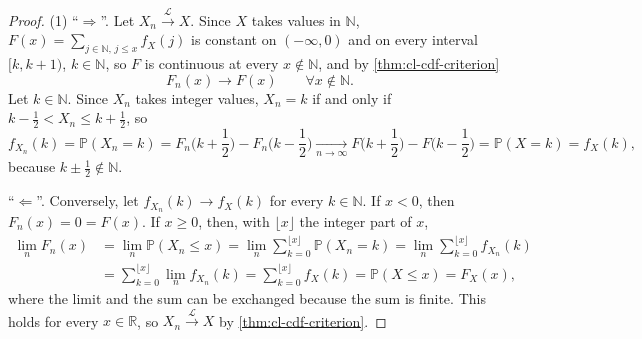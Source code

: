 \begin{proof}
(1) ``$\Rightarrow$''. Let $X_n\xrightarrow{\mathcal L}X$. Since $X$ takes values in $\mathbb N$,
$F(x)=\sum_{j\in\mathbb N,\,j\le x}f_X(j)$ is constant on $(-\infty,0)$ and on every interval
$[k,k+1)$, $k\in\mathbb N$, so $F$ is continuous at every $x\notin\mathbb N$, and by
\cref{thm:cl-cdf-criterion}
\[
  F_n(x)\to F(x)\qquad\forall x\notin\mathbb N .
\]
Let $k\in\mathbb N$. Since $X_n$ takes integer values, $X_n=k$ if and only if
$k-\frac12<X_n\le k+\frac12$, so
\[
  f_{X_n}(k)=\mathbb P(X_n=k)=F_n\Big(k+\frac12\Big)-F_n\Big(k-\frac12\Big)
  \xrightarrow[n\to\infty]{}F\Big(k+\frac12\Big)-F\Big(k-\frac12\Big)=\mathbb P(X=k)=f_X(k),
\]
because $k\pm\frac12\notin\mathbb N$.

``$\Leftarrow$''. Conversely, let $f_{X_n}(k)\to f_X(k)$ for every $k\in\mathbb N$. If $x<0$, then
$F_n(x)=0=F(x)$. If $x\ge0$, then, with $\lfloor x\rfloor$ the integer part of $x$,
\[
\begin{aligned}
  \lim_nF_n(x)&=\lim_n\mathbb P(X_n\le x)=\lim_n\sum_{k=0}^{\lfloor x\rfloor}\mathbb P(X_n=k)
  =\lim_n\sum_{k=0}^{\lfloor x\rfloor}f_{X_n}(k)\\
  &=\sum_{k=0}^{\lfloor x\rfloor}\lim_nf_{X_n}(k)=\sum_{k=0}^{\lfloor x\rfloor}f_X(k)
  =\mathbb P(X\le x)=F_X(x),
\end{aligned}
\]
where the limit and the sum can be exchanged because the sum is finite. This holds for every
$x\in\mathbb R$, so $X_n\xrightarrow{\mathcal L}X$ by \cref{thm:cl-cdf-criterion}.


\end{proof}
